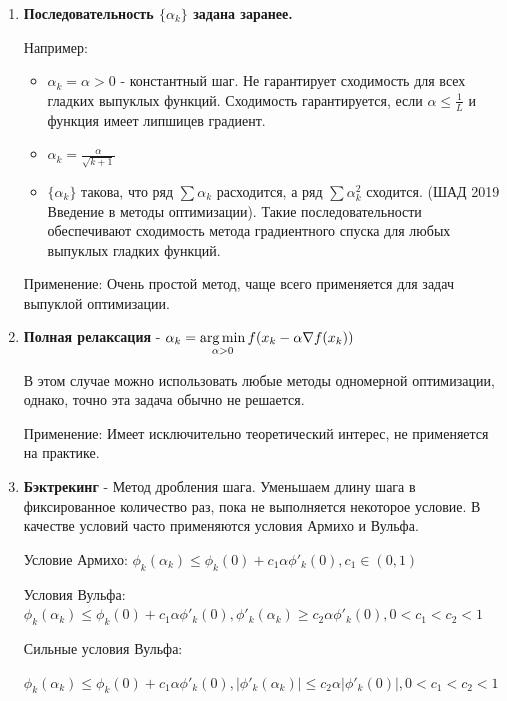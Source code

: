 \begin{enumerate}
    \item {\bf Последовательность
    $\{\alpha_k\}$ задана заранее.}

    Например:
    \begin{itemize}
        \item  $\alpha_k = \alpha > 0$ - константный шаг.
        Не гарантирует сходимость для всех гладких выпуклых функций. Сходимость гарантируется, если
        $\alpha \leqslant \frac{1}{L}$ и функция имеет липшицев градиент.
        \item  $\alpha_k = \frac{\alpha}{\sqrt{k+1}}$
        \item $\{\alpha_k\}$ такова,  что ряд
        $\sum \alpha_k$ расходится, а ряд $\sum \alpha_k^2$ сходится.         (ШАД 2019 Введение в методы оптимизации).
        Такие последовательности обеспечивают сходимость метода градиентного спуска для любых выпуклых гладких функций.
    \end{itemize}

    Применение:
    Очень простой метод, чаще всего применяется для задач выпуклой оптимизации.
    \item {\bf Полная релаксация} -
    $\alpha_k =  \operatorname*{arg\,min}\limits_{\alpha > 0} f(x_k - \alpha \nabla f(x_k))$

    В этом случае можно использовать любые методы одномерной оптимизации, однако, точно эта задача обычно не решается.

    Применение:
    Имеет исключительно теоретический интерес, не применяется на практике.

    \item {\bf Бэктрекинг} - Метод дробления шага.
    Уменьшаем длину шага в фиксированное количество раз, пока не выполняется некоторое условие. В качестве условий часто применяются условия Армихо и Вульфа.

    Условие Армихо:
    $
        \phi_k (\alpha_k) \leqslant \phi_k(0) + c_1 \alpha \phi'_k(0), c_1 \in (0, 1)
    $

        Условия Вульфа:
    $
        \phi_k (\alpha_k) \leqslant \phi_k(0) + c_1 \alpha \phi'_k(0),
        \phi'_k (\alpha_k) \geqslant c_2 \alpha \phi'_k(0),
        0 < c_1 < c_2 < 1
    $

    Сильные условия Вульфа:

    \quad \quad $
        \phi_k (\alpha_k) \leqslant \phi_k(0) + c_1 \alpha \phi'_k(0),
        |\phi'_k (\alpha_k)| \leqslant c_2 \alpha |\phi'_k(0)|,
        0 < c_1 < c_2 < 1
    $



\end{enumerate}
